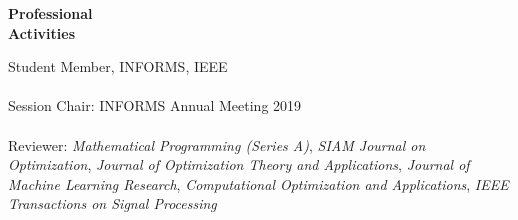 \documentclass[11pt]{article}
\newcommand{\TSP}{IEEE Transactions on Signal Processing}
\newcommand{\SIOPT}{SIAM Journal on Optimization}
\newcommand{\JMLR}{Journal of Machine Learning Research}
\newcommand{\MPA}{Mathematical Programming (Series A)}
\newcommand{\COA}{Computational Optimization and Applications}
\newcommand{\JOTA}{Journal of Optimization Theory and Applications}
\begin{document}
\begin{minipage}[t]{0.18\textwidth}
\textbf{Professional \\Activities}
\end{minipage}
\begin{minipage}[t]{0.8\textwidth}
Student Member, INFORMS, IEEE\\\\
Session Chair: INFORMS Annual Meeting 2019\\\\
Reviewer: {\em \MPA}, {\em \SIOPT}, {\em \JOTA}, {\em \JMLR}, {\em \COA}, {\em \TSP} %
\end{minipage} \newline\newline






\end{document}
